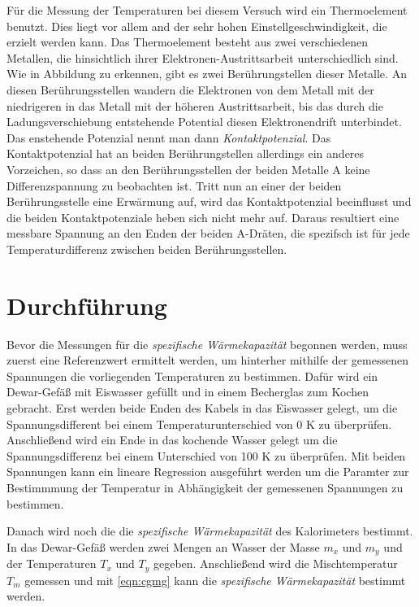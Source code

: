 Für die Messung der Temperaturen bei diesem Versuch wird ein Thermoelement benutzt.
Dies liegt vor allem and der sehr hohen Einstellgeschwindigkeit, die erzielt werden
kann. Das Thermoelement besteht aus zwei verschiedenen Metallen, die hinsichtlich
ihrer Elektronen-Austrittsarbeit unterschiedlich sind. Wie in Abbildung %
zu erkennen, gibt es zwei Berührungstellen dieser Metalle. An diesen Berührungsstellen
wandern die Elektronen von dem Metall mit der niedrigeren in das Metall mit der
höheren Austrittsarbeit, bis das durch die Ladungsverschiebung entstehende Potential
diesen Elektronendrift unterbindet. Das enstehende Potenzial nennt man dann
\emph{Kontaktpotenzial}. Das Kontaktpotenzial hat an beiden Berührungstellen
allerdings ein anderes Vorzeichen, so dass an den Berührungsstellen der beiden
Metalle A keine Differenzspannung zu beobachten ist. Tritt nun an einer der beiden
Berührungsstelle eine Erwärmung auf, wird das Kontaktpotenzial beeinflusst und
die beiden Kontaktpotenziale heben sich nicht mehr auf. Daraus resultiert eine
messbare Spannung an den Enden der beiden A-Dräten, die spezifsch ist für jede
Temperaturdifferenz zwischen beiden Berührungsstellen.

\section{Durchführung}

Bevor die Messungen für die \emph{spezifische Wärmekapazität} begonnen werden,
muss zuerst eine Referenzwert ermittelt werden, um hinterher mithilfe der gemessenen
Spannungen die vorliegenden Temperaturen zu bestimmen. Dafür wird ein Dewar-Gefäß
mit Eiswasser gefüllt und in einem Becherglas zum Kochen gebracht. Erst werden
beide Enden des Kabels in das Eiswasser gelegt, um die Spannungsdifferent bei
einem Temperaturunterschied von 0 K zu überprüfen. Anschließend wird ein Ende in
das kochende Wasser gelegt um die Spannungsdifferenz bei einem Unterschied von
100 K zu überprüfen. Mit beiden Spannungen kann ein lineare Regression ausgeführt
werden um die Paramter zur Bestimmmung der Temperatur in Abhängigkeit der
gemessenen Spannungen zu bestimmen.

Danach wird noch die die \emph{spezifische Wärmekapazität} des Kalorimeters bestimmt.
In das Dewar-Gefäß werden zwei Mengen an Wasser der Masse $m_x$ und $m_y$ und der
Temperaturen $T_x$ und $T_y$ gegeben. Anschließend wird die Mischtemperatur
$T_m$ gemessen und mit \eqref{eqn:cgmg} kann die \emph{spezifische Wärmekapazität}
bestimmt werden.

